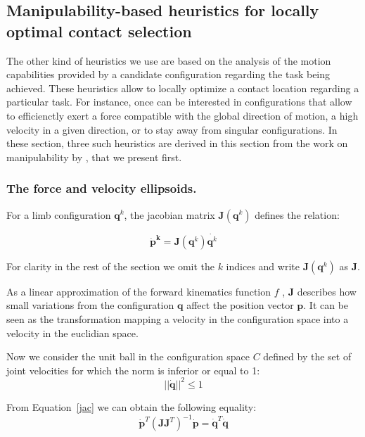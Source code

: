 \subsection{Manipulability-based heuristics for locally optimal contact selection}
The other kind of heuristics we use are based on the analysis of the motion capabilities
provided by a candidate configuration regarding the task being achieved.
These heuristics allow to locally optimize a contact location regarding a particular task.
For instance, once can be interested in configurations that allow to efficienctly exert a force compatible with the global direction of motion,
a high velocity in a given direction, or to stay away from singular configurations.
In these section, three such heuristics are derived in this section from the work on manipulability by \cite{Yoshikawa1984}, that we present first.

\subsubsection{The force and velocity ellipsoids.}
For a limb configuration $\mathbf{q}^k$, the jacobian matrix
 $\mathbf{J}(\mathbf{q}^k)$   defines the relation:
 
\begin{equation} \label{jac}
\mathbf{\dot{p}^k} = \mathbf{J}(\mathbf{q}^k) \dot{\mathbf{q}^k}
\end{equation}

For clarity in the rest of the section we omit the $k$ indices and write $\mathbf{J}(\mathbf{q}^k)$ as $\mathbf{J}$.
 
As a linear approximation of the forward kinematics function $f$ , $\mathbf{J}$ describes how small
variations from the configuration $\mathbf{q}$ affect the position vector $\mathbf{p}$.
It can be seen as the transformation mapping a velocity in the configuration space into a velocity in
the euclidian space.

Now we consider the unit ball in the configuration space $C$ defined by the set of joint velocities
for which the norm is inferior or equal to 1:
\begin{equation} \label{ball}
||\dot{\mathbf{q}}||^2 \leq 1
\end{equation}

From Equation~\ref{jac} we can obtain the following equality:
\begin{equation} \label{jaceq}
\mathbf{\dot{p}}^T(\mathbf{J}\mathbf{J}^T)^{-1}\mathbf{\dot{p}} = \dot{\mathbf{q}}^T \dot{\mathbf{q}}
\end{equation}

